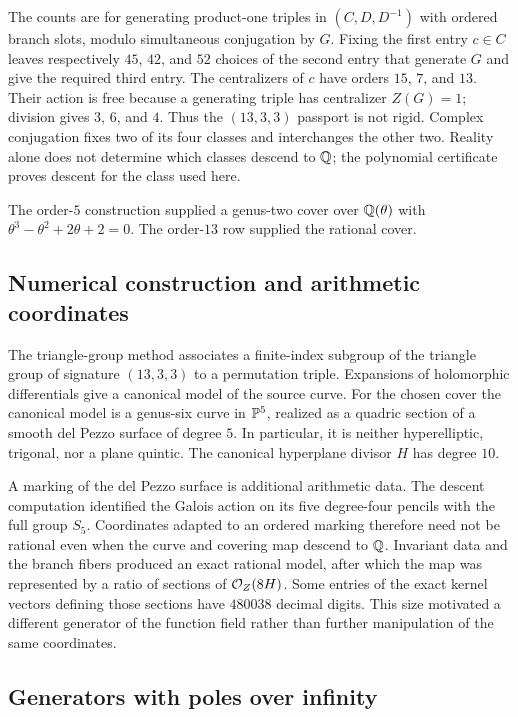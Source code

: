 The counts are for generating product-one triples in $(C,D,D^{-1})$
with ordered branch slots, modulo simultaneous conjugation by $G$.
Fixing the first entry $c\in C$ leaves respectively $45$, $42$, and $52$
choices of the second entry that generate $G$ and give the required third
entry. The centralizers of $c$ have orders $15$, $7$, and $13$.
Their action is free because a generating triple has centralizer $Z(G)=1$;
division gives $3$, $6$, and $4$. Thus the $(13,3,3)$ passport is not rigid.
Complex conjugation fixes two of its four classes and interchanges the
other two. Reality alone does not determine which classes descend to $\mathbb{Q}$;
the polynomial certificate proves descent for the class used here.

The order-$5$ construction supplied a genus-two cover over
$\mathbb{Q}(\theta)$ with $\theta^3-\theta^2+2\theta+2=0$. The order-$13$ row
supplied the rational cover.

\subsection{Numerical construction and arithmetic coordinates}

The triangle-group method associates a finite-index subgroup of the
triangle group of signature $(13,3,3)$ to a permutation triple. Expansions
of holomorphic differentials give a canonical model of the source curve.
For the chosen cover the canonical model is a genus-six curve in $\mathbb{P}^5$,
realized as a quadric section of a smooth del Pezzo surface of degree $5$.
In particular, it is neither hyperelliptic, trigonal, nor a plane quintic.
The canonical hyperplane divisor $H$ has degree $10$.

A marking of the del Pezzo surface is additional arithmetic data.  The
descent computation identified the Galois action on its five degree-four
pencils with the full group $S_5$.  Coordinates adapted to an ordered
marking therefore need not be rational even when the curve and covering
map descend to $\mathbb{Q}$.  Invariant data and the branch fibers produced an
exact rational model, after which the map was represented by a ratio of
sections of $\mathcal{O}_Z(8H)$.  Some entries of the exact kernel vectors defining
those sections have $480038$ decimal digits.  This size motivated a
different generator of the function field rather than further manipulation
of the same coordinates.

\subsection{Generators with poles over infinity}

